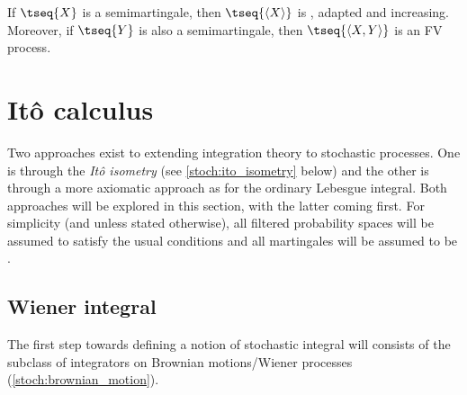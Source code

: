     \begin{property}
        If $\tseq{X}$ is a semimartingale, then $\tseq{\langle X \rangle}$ is \cdlgg, adapted and increasing. Moreover, if $\tseq{Y}$ is also a semimartingale, then $\tseq{\langle X,Y \rangle}$ is an FV process.
    \end{property}


\section{It\^o calculus}\label{section:stochastic_integral}

    Two approaches exist to extending integration theory to stochastic processes. One is through the \textit{It\^o isometry} (see \cref{stoch:ito_isometry} below) and the other is through a more axiomatic approach as for the ordinary Lebesgue integral. Both approaches will be explored in this section, with the latter coming first. For simplicity (and unless stated otherwise), all filtered probability spaces will be assumed to satisfy the usual conditions and all martingales will be assumed to be \cdlgg.

\subsection{Wiener integral}

    The first step towards defining a notion of stochastic integral will consists of the subclass of integrators on Brownian motions/Wiener processes (\cref{stoch:brownian_motion}).

